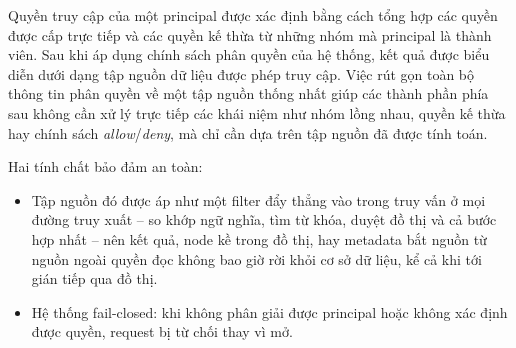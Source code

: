 Quyền truy cập của một principal được xác định bằng cách tổng hợp các quyền được cấp trực tiếp và các quyền kế thừa từ những nhóm mà principal là thành viên. Sau khi áp dụng chính sách phân quyền của hệ thống, kết quả được biểu diễn dưới dạng tập nguồn dữ liệu được phép truy cập. Việc rút gọn toàn bộ thông tin phân quyền về một tập nguồn thống nhất giúp các thành phần phía sau không cần xử lý trực tiếp các khái niệm như nhóm lồng nhau, quyền kế thừa hay chính sách \textit{allow}/\textit{deny}, mà chỉ cần dựa trên tập nguồn đã được tính toán.

Hai tính chất bảo đảm an toàn:

\begin{itemize}
  \item Tập nguồn đó được áp như một filter đẩy thẳng vào trong truy vấn ở mọi đường truy xuất -- so khớp ngữ nghĩa, tìm từ khóa, duyệt đồ thị và cả bước hợp nhất -- nên kết quả, node kề trong đồ thị, hay metadata bắt nguồn từ nguồn ngoài quyền đọc không bao giờ rời khỏi cơ sở dữ liệu, kể cả khi tới gián tiếp qua đồ thị. 
  \item Hệ thống fail-closed: khi không phân giải được principal hoặc không xác định được quyền, request bị từ chối thay vì mở.
\end{itemize}
